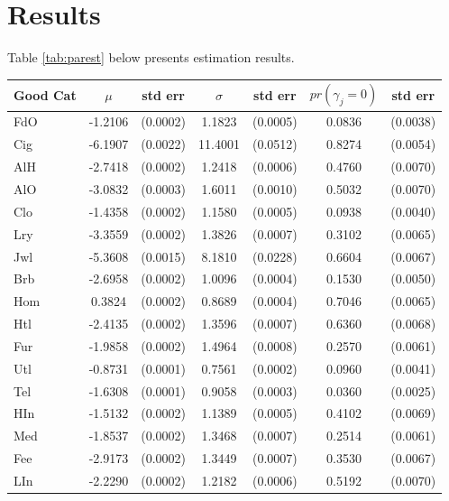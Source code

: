 \documentclass{article}
\begin{document}
\section{Results}
Table \ref{tab:parest} below presents estimation results.  
\begin{table}
	\begin{center}
		\begin{tabular}{|l|c c |c c |c c|}
			\hline
			Good Cat & $\mu$ & std err      & $\sigma$ & std err       & $pr(\gamma_j =  0)$ & std err\\
			\hline
			FdO & -1.2106 &  (0.0002) &  1.1823 & (0.0005) &   0.0836 & (0.0038)\\ 
			\hline
			Cig & -6.1907 &  (0.0022) & 11.4001 & (0.0512) &   0.8274 & (0.0054)\\ 
			\hline
			AlH & -2.7418 &  (0.0002) &  1.2418 & (0.0006) &   0.4760 & (0.0070)\\ 
			\hline
			AlO & -3.0832 &  (0.0003) &  1.6011 & (0.0010) &   0.5032 & (0.0070)\\ 
			\hline
			Clo & -1.4358 &  (0.0002) &  1.1580 & (0.0005) &   0.0938 & (0.0040)\\ 
			\hline
			Lry & -3.3559 &  (0.0002) &  1.3826 & (0.0007) &   0.3102 & (0.0065)\\ 
			\hline
			Jwl & -5.3608 &  (0.0015) &  8.1810 & (0.0228) &   0.6604 & (0.0067)\\ 
			\hline
			Brb & -2.6958 &  (0.0002) &  1.0096 & (0.0004) &   0.1530 & (0.0050)\\ 
			\hline
			Hom &  0.3824 &  (0.0002) &  0.8689 & (0.0004) &   0.7046 & (0.0065)\\ 
			\hline
			Htl & -2.4135 &  (0.0002) &  1.3596 & (0.0007) &   0.6360 & (0.0068)\\ 
			\hline
			Fur & -1.9858 &  (0.0002) &  1.4964 & (0.0008) &   0.2570 & (0.0061)\\ 
			\hline
			Utl & -0.8731 &  (0.0001) &  0.7561 & (0.0002) &   0.0960 & (0.0041)\\ 
			\hline
			Tel & -1.6308 &  (0.0001) &  0.9058 & (0.0003) &   0.0360 & (0.0025)\\ 
			\hline
			HIn & -1.5132 &  (0.0002) &  1.1389 & (0.0005) &   0.4102 & (0.0069)\\ 
			\hline
			Med & -1.8537 &  (0.0002) &  1.3468 & (0.0007) &   0.2514 & (0.0061)\\ 
			\hline
			Fee & -2.9173 &  (0.0002) &  1.3449 & (0.0007) &   0.3530 & (0.0067)\\ 
			\hline
			LIn & -2.2290 &  (0.0002) &  1.2182 & (0.0006) &   0.5192 & (0.0070)\\ 

\end{tabular}
\end{center}
\end{table}
\end{document}
